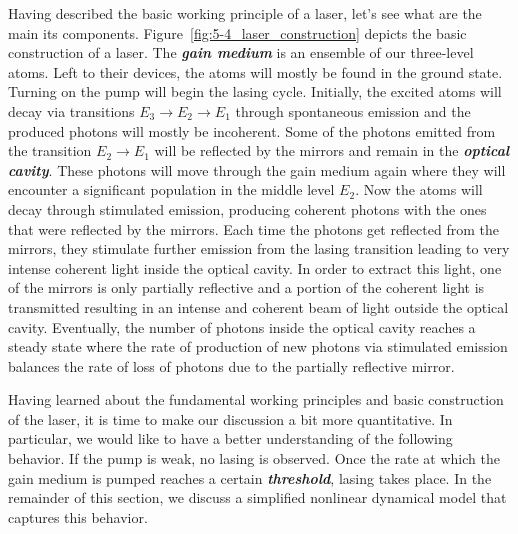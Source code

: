Having described the basic working principle of a laser, let's see what are the main its components.
Figure~\ref{fig:5-4_laser_construction} depicts the basic construction of a laser.
The \textbf{\emph{gain medium}} is an ensemble of our three-level atoms.
Left to their devices, the atoms will mostly be found in the ground state.
Turning on the pump will begin the lasing cycle.
Initially, the excited atoms will decay via transitions $E_3 \rightarrow E_2 \rightarrow E_1$ through spontaneous emission and the produced photons will mostly be incoherent.
Some of the photons emitted from the transition $E_2 \rightarrow E_1$ will be reflected by the mirrors and remain in the \textbf{\emph{optical cavity}}.
These photons will move through the gain medium again where they will encounter a significant population in the middle level $E_2$.
Now the atoms will decay through stimulated emission, producing coherent photons with the ones that were reflected by the mirrors.
Each time the photons get reflected from the mirrors, they stimulate further emission from the lasing transition leading to very intense coherent light inside the optical cavity.
In order to extract this light, one of the mirrors is only partially reflective and a portion of the coherent light is transmitted resulting in an intense and coherent beam of light outside the optical cavity.
Eventually, the number of photons inside the optical cavity reaches a steady state where the rate of production of new photons via stimulated emission balances the rate of loss of photons due to the partially reflective mirror.

Having learned about the fundamental working principles and basic construction of the laser, it is time to make our discussion a bit more quantitative.
In particular, we would like to have a better understanding of the following behavior.
If the pump is weak, no lasing is observed.
Once the rate at which the gain medium is pumped reaches a certain \textbf{\emph{threshold}}, lasing takes place.
In the remainder of this section, we discuss a simplified nonlinear dynamical model that captures this behavior.


